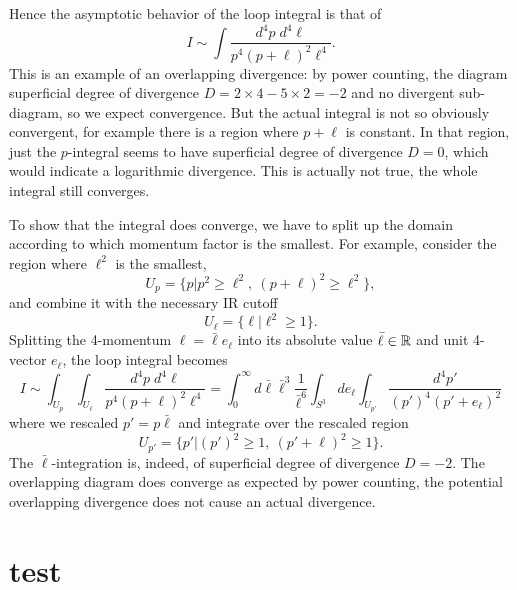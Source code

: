 \documentclass[12pt]{article}
\begin{document}
Hence the asymptotic behavior of the loop integral is that of 
\begin{equation}
  I \sim
  \int \frac{d^4p \; d^4\ell}{p^4 (p+\ell)^2 \ell^4}.
\end{equation}
This is an example of an overlapping divergence: by power counting,
the diagram superficial degree of divergence $D=2\times 4-5\times 2
=-2$ and no divergent sub-diagram, so we expect convergence. But the
actual integral is not so obviously convergent, for example there is a
region where $p+\ell$ is constant. In that region, just the
$p$-integral seems to have superficial degree of divergence $D=0$,
which would indicate a logarithmic divergence. This is actually not
true, the whole integral still converges.

To show that the integral does converge, we have to split up the
domain according to which momentum factor is the smallest. For
example, consider the region where $\ell^2$ is the smallest,
\begin{equation}
  U_p = \big\{
  p \big|
  p^2 \geq \ell^2,~ (p+\ell)^2 \geq \ell^2  \big\},
\end{equation}
and combine it with the necessary IR cutoff
\begin{equation}
  U_\ell = \big\{
  \ell \big| \ell^2 \geq 1 \big\}.
\end{equation}
Splitting the 4-momentum $\ell = \bar\ell e_\ell$ into its absolute
value $\bar\ell\in{\mathbb{R}}$ and unit 4-vector $e_\ell$, the loop integral
becomes
\begin{equation}
  I \sim
  \int_{U_p} \int_{U_\ell}
  \frac{d^4p \; d^4\ell}{p^4 (p+\ell)^2 \ell^4}
  = 
  \int_0^\infty d\bar\ell
  \bar\ell^3
  \frac{1}{\bar\ell^6}
  \int_{S^3} de_\ell 
  \int_{U_{p'}}
  \frac{d^4 p'}{(p')^4 (p'+e_\ell)^2}
\end{equation}
where we rescaled $p' = p \bar\ell$ and integrate over the  rescaled
region
\begin{equation}
  U_{p'} = \big\{
  p' \big|
  (p')^2 \geq 1,~ (p'+\ell)^2 \geq 1  \big\}.
\end{equation}
The $\bar\ell$-integration is, indeed, of superficial degree of
divergence $D=-2$. The overlapping diagram does converge as expected
by power counting, the potential overlapping divergence does not cause
an actual divergence.










\newpage
\appendix

\section{test}



 
\renewcommand{\refname}{Bibliography}

\end{document}

